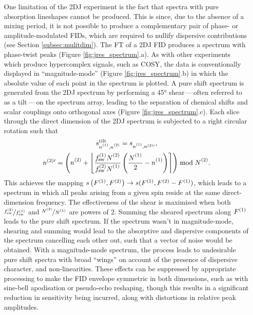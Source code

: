 One limitation of the \ac{2DJ} experiment is the fact that
spectra with pure absorption lineshapes cannot be produced. This is since, due
to the absence of a mixing period, it is not possible to produce a
complementary pair of phase- or amplitude-modulated \acp{FID}, which are
required to nullify dispersive contributions (see Section
\ref{subsec:mulitdim}).
The FT of a \ac{2DJ} \ac{FID} produces a spectrum with phase-twist
peaks (Figure \ref{fig:jres_spectrum}.a). As with other experiments which
produce hypercomplex signals, such as \ac{COSY}, the data is conventionally
displayed in ``magnitude-mode'' (Figure \ref{fig:jres_spectrum}.b) in which the
absolute value of each point in the spectrum is plotted.
A pure shift spectrum is generated from the \ac{2DJ} spectrum by performing a
\ang{45} shear\,---\,often referred to as a tilt\,---\,on the spectrum array,
leading to the separation of chemical shifts and scalar couplings onto
orthogonal axes (Figure \ref{fig:jres_spectrum}.c). Each slice through the
direct dimension of the \ac{2DJ} spectrum is subjected to a right circular
rotation such that
\begin{subequations}
    \begin{gather}
        s_{\none,\ntwo}^{\text{tilt}} =
            s_{\none,n^{(2)\prime}},\\
        n^{(2)\prime} = \left(\ntwo + \left\lfloor
                \frac
                    {\fswone \Ntwo\vpsub{\mathrm{sw}}}
                    {\fswtwo \None\vpsub{\mathrm{sw}}}
                \left(
                    \frac{\None\vpsub{\mathrm{sw}}}{2} - \none
                \right)
            \right\rceil
        \right) \bmod \Ntwo.
    \end{gather}
\end{subequations}
This achieves the mapping $s\left(F^{(1)},F^{(2)}\right) \rightarrow s(F^{(1)}, F^{(2)}
- F^{(1)})$, which leads to a spectrum in which all peaks arising from a
given spin reside at the same direct-dimension frequency. The
effectiveness of the shear is maximised when both $\nicefrac{f_{\mathrm{sw}}^{(2)}}{f_{\mathrm{sw}}^{(1)}}$
and $\nicefrac{\Ntwo}{\None}$ are powers of 2. Summing the
sheared spectrum along $F^{(1)}$ leads to the pure shift spectrum.
If the spectrum wasn't in magnitude-mode, shearing and summing would lead to
the absorptive and dispersive components of the spectrum cancelling each other
out, such that a vector of noise would be obtained.
With a magnitude-mode spectrum, the process leads to undesirable pure shift
spectra with broad ``wings'' on account of the presence of dispersive
character, and non-linearities. These effects can be suppressed by appropriate
processing to make the FID envelope symmetric in both dimensions, such as with
sine-bell apodisation or pseudo-echo reshaping\cite{Bax1981}, though this
results in a significant reduction in sensitivity being incurred, along with
distortions in relative peak amplitudes.

